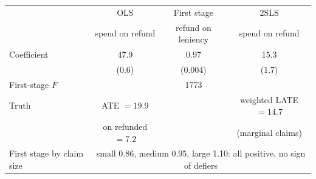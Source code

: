 \begin{tabular}{lccc}\toprule
 & OLS & First stage & 2SLS \\
 & spend on refund & refund on leniency & spend on refund \\ \midrule
Coefficient & 47.9 & 0.97 & 15.3 \\
 & (0.6) & (0.004) & (1.7) \\
First-stage $F$ & & 1773 &  \\
\midrule Truth & ATE $= 19.9$ & & weighted LATE $= 14.7$ \\
 & on refunded $= 7.2$ & & (marginal claims) \\
\midrule First stage by claim size & \multicolumn{3}{c}{small 0.86, medium 0.95, large 1.10: all positive, no sign of defiers} \\
\bottomrule\end{tabular}
